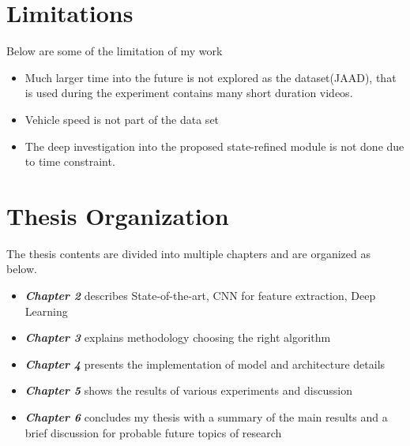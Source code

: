 \section{Limitations}
Below are some of the limitation of my work
\begin{itemize}
	\item Much larger time into the future is not explored as the dataset(JAAD), that is used during the experiment contains many short duration videos. 

	\item Vehicle speed is not part of the data set
	\item The deep investigation into the proposed state-refined module is not done due to time constraint.
\end{itemize}

\section{Thesis Organization }
The thesis contents are divided into multiple chapters and are organized as below.
\begin{itemize}
  \item {\textbf {\textit{Chapter 2}} describes State-of-the-art, CNN for feature extraction, Deep Learning}
  \item {\textbf {\textit{Chapter 3}} explains methodology choosing the right algorithm}
	\item {\textbf {\textit{Chapter 4}} presents the implementation of model and architecture details  }
	\item {\textbf {\textit{Chapter 5}} shows the results of various experiments and discussion  }
	\item {\textbf {\textit{Chapter 6}} concludes my thesis with a summary of the main results and a brief discussion for probable future topics of research}
\end{itemize}
